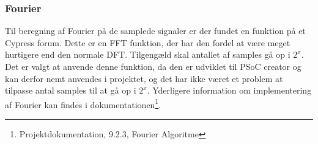 
\subsubsection{Fourier}

Til beregning af Fourier på de samplede signaler er der fundet en funktion på et Cypress forum\cite{FFTalgo}. Dette er en FFT funktion, der har den fordel at være meget hurtigere end den normale DFT. Tilgengæld skal antallet af samples gå op i $2^{x}$. Det er valgt at anvende denne funktion, da den er udviklet til PSoC creator og kan derfor nemt anvendes i projektet, og det har ikke været et problem at tilpasse antal samples til at gå op i $2^{x}$. Yderligere information om implementering af Fourier kan findes i dokumentationen\footnote{Projektdokumentation, 9.2.3, Fourier Algoritme}. 